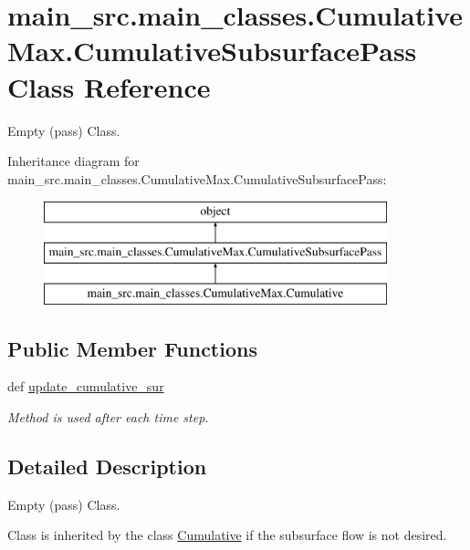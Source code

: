 \hypertarget{classmain__src_1_1main__classes_1_1CumulativeMax_1_1CumulativeSubsurfacePass}{\section{main\-\_\-src.\-main\-\_\-classes.\-Cumulative\-Max.\-Cumulative\-Subsurface\-Pass Class Reference}
\label{classmain__src_1_1main__classes_1_1CumulativeMax_1_1CumulativeSubsurfacePass}
}


Empty (pass) Class.  


Inheritance diagram for main\-\_\-src.\-main\-\_\-classes.\-Cumulative\-Max.\-Cumulative\-Subsurface\-Pass\-:\begin{figure}[H]
\begin{center}
\leavevmode
\includegraphics[height=3.000000cm]{classmain__src_1_1main__classes_1_1CumulativeMax_1_1CumulativeSubsurfacePass}
\end{center}
\end{figure}
\subsection*{Public Member Functions}
\begin{DoxyCompactItemize}
\item 
def \hyperlink{classmain__src_1_1main__classes_1_1CumulativeMax_1_1CumulativeSubsurfacePass_a8acce6867f8fde6d166eaebcb5bfee9c}{update\-\_\-cumulative\-\_\-sur}
\begin{DoxyCompactList}\small\item\em Method is used after each time step. \end{DoxyCompactList}\end{DoxyCompactItemize}


\subsection{Detailed Description}
Empty (pass) Class. 

Class is inherited by the class \hyperlink{classmain__src_1_1main__classes_1_1CumulativeMax_1_1Cumulative}{Cumulative} if the subsurface flow is not desired. 

